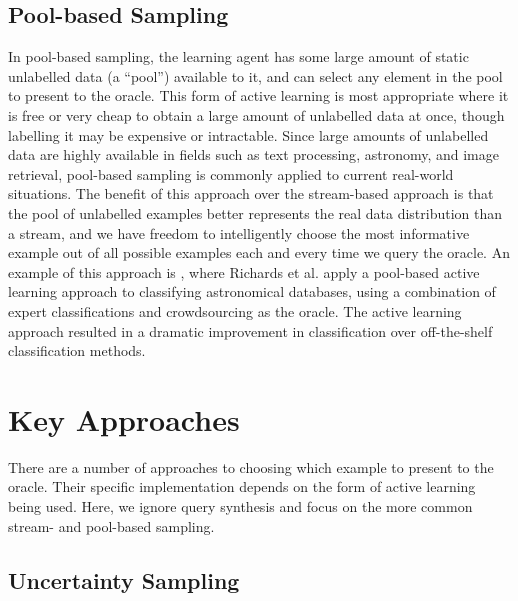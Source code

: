 \documentclass[a4paper]{article}
\begin{document}
        \subsection{Pool-based Sampling}

            In pool-based sampling, the learning agent has some large amount of static unlabelled data (a ``pool'') available to it, and can select any element in the pool to present to the oracle. This form of active learning is most appropriate where it is free or very cheap to obtain a large amount of unlabelled data at once, though labelling it may be expensive or intractable. Since large amounts of unlabelled data are highly available in fields such as text processing\cite{lewis94}, astronomy\cite{pelleg04,richards12,lintott08,marshall15}, and image retrieval\cite{tong01}, pool-based sampling is commonly applied to current real-world situations\cite{guyon11,settles09}. The benefit of this approach over the stream-based approach is that the pool of unlabelled examples better represents the real data distribution than a stream\cite{mccallum98}, and we have freedom to intelligently choose the most informative example out of all possible examples each and every time we query the oracle. An example of this approach is \cite{richards12}, where Richards et al. apply a pool-based active learning approach to classifying astronomical databases, using a combination of expert classifications and crowdsourcing as the oracle. The active learning approach resulted in a dramatic improvement in classification over off-the-shelf classification methods.

    \section{Key Approaches}

        There are a number of approaches to choosing which example to present to the oracle. Their specific implementation depends on the form of active learning being used. Here, we ignore query synthesis and focus on the more common stream- and pool-based sampling.

        \subsection{Uncertainty Sampling}
\end{document}
